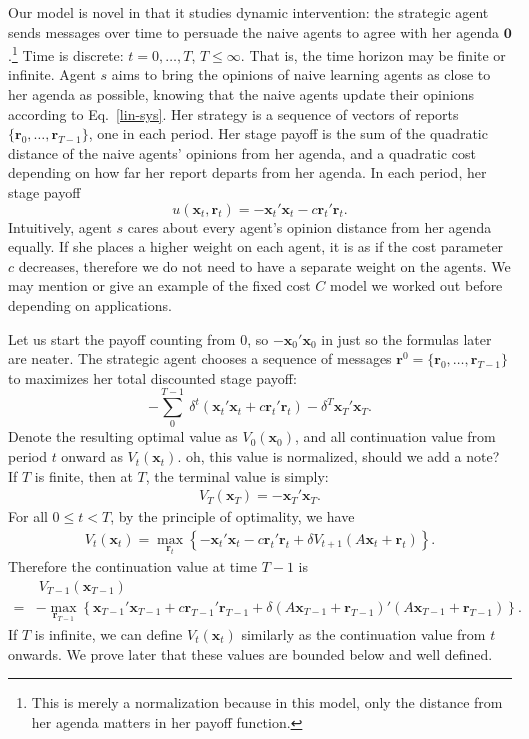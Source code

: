 \documentclass{article}
\newcommand{\x}{\mathbf{x}}
\newcommand{\re}{\mathbf{r}}
\newcommand{\wl}[1]{{\color{blue} #1}}
\begin{document}
Our model is novel in that it studies dynamic intervention: the strategic agent sends messages over time to persuade the naive agents to agree with her agenda $\mathbf 0$.\footnote{This is merely a normalization because in this model, only the distance from her agenda matters in her payoff function.} Time is discrete: $t=0,\ldots,T$, $T\leq \infty$. That is, the time horizon may be finite or infinite. Agent $s$ aims to bring the opinions of naive learning agents as close to her agenda as possible, knowing that the naive agents update their opinions according to  Eq.~\eqref{lin-sys}. Her strategy is a sequence of vectors of reports $\{\re_0,\ldots,\re_{T-1}\}$, one in each period. Her stage payoff is the sum of the quadratic distance of the naive agents' opinions from her agenda, and a quadratic cost  depending on how far her report departs from her agenda. In each period, her stage payoff $$u(\x_t,\re_t)= -\x_t'\x_t-c\re_t'\re_t.$$ Intuitively, agent $s$ cares about every agent's opinion distance from her agenda equally. If she places a higher weight on each agent, it is as if the cost parameter $c$ decreases, therefore we do not need to have a separate weight on the agents. \wl{We may mention or give an example of the fixed cost $C$ model we worked out before depending on applications.}

\wl{Let us start the payoff counting from $0$, so $-\x_0'\x_0$ in just so the formulas later are neater.} 
The strategic agent chooses a sequence of messages $\re^0=\{\re_0,\ldots,\re_{T-1}\}$ to maximizes her total discounted stage payoff: 
$$-\sum_{0}^{T-1} \ \delta^t (\x_t' \x_t+c\re_t'\re_t)-\delta^{T}\x_T'\x_T.$$ 
Denote the resulting optimal value as $V_0(\x_0)$, and all continuation value from period $t$ onward as $V_t(\x_t)$. \wl{oh, this value is normalized, should we add a note?}
If $T$ is finite, then at $T$, the terminal value is simply: 
\begin{align*}
	V_{T}(\x_T) = -\x_T'\x_T.
\end{align*}
For all $0\leq t<T$, by the principle of optimality, we have
\begin{align*} 
	V_t(\x_t) = \max_{\re_t} \left\{ -\x_t'\x_t-c\re_t'\re_t+\delta V_{t+1}(A\x_t+\re_t) \right\}.
\end{align*}
Therefore the continuation value at time $T-1$ is 
\begin{align*}
& \ V_{T-1}(\x_{T-1}) \\
=& -\max_{\re_{T-1}}\left \{  \x_{T-1}'\x_{T-1}+c\re_{T-1}'\re_{T-1}+ \delta(A\x_{T-1}+\re_{T-1})'(A\x_{T-1}+\re_{T-1})\right \}.
\end{align*}
If $T$ is infinite, we can define $V_t(\x_t)$ similarly as the continuation value from $t$ onwards. We prove later that these values are bounded below and well defined. 
\end{document}
